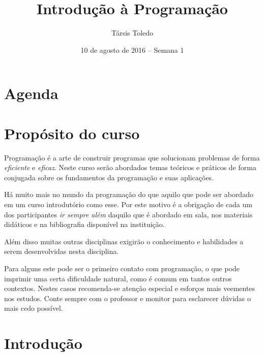 \documentclass[justified]{tufte-handout}
\title{Introdução à Programação}
\author{Társis Toledo}
\date{10 de agosto de 2016 -- Semana 1}
\begin{document}
\maketitle

\section{Agenda}

\section{Propósito do curso}

Programação é a arte de construir programas que solucionam problemas de forma \emph{eficiente} e \emph{eficaz}. Neste curso serão abordados temas teóricos e práticos de forma conjugada sobre os fundamentos da programação e suas aplicações.

Há muito mais no mundo da programação do que aquilo que pode ser abordado em um curso introdutório como esse. Por este motivo é a obrigação de cada um dos participantes \emph{ir sempre além} daquilo que é abordado em sala, nos materiais didáticos e na bibliografia disponível na instituição.

Além disso muitas outras disciplinas exigirão o conhecimento e habilidades a serem desenvolvidas nesta disciplina.

Para alguns este pode ser o primeiro contato com programação, o que pode imprimir uma certa dificuldade natural, como é comum em tantos outros contextos. Nestes casos recomenda-se atenção especial e esforços mais veementes nos estudos. Conte sempre com o professor e monitor para esclarecer dúvidas o mais cedo possível.


\section{Introdução}

\end{document}
